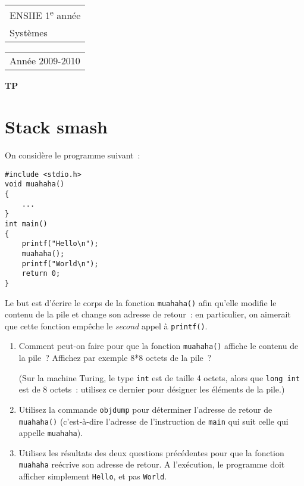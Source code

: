 \documentclass[a4paper,12pt]{article}
\begin{document}
{\large\sffamily
\begin{tabular}[t]{l}
  ENSIIE 1\textsuperscript{e} année\\
  Systèmes
\end{tabular}%
\hfill%
\begin{tabular}[t]{r}
  Année 2009-2010
\end{tabular}}

\vspace{2em}
\begin{center}
  \Large\bfseries\sffamily TP 
\end{center}
\vspace{1em}


\section{Stack smash}

On considère le programme suivant~:
\begin{verbatim}
#include <stdio.h>
void muahaha()
{
    ...
}
int main()
{
    printf("Hello\n");
    muahaha();
    printf("World\n");
    return 0;
}
\end{verbatim}
Le but est d'écrire le corps de la fonction \texttt{muahaha()} afin
qu'elle modifie le contenu de la pile et change son adresse de
retour~: en particulier, on aimerait que cette fonction empêche le
\emph{second} appel à \texttt{printf()}.

\begin{enumerate}
\item Comment peut-on faire pour que la fonction \texttt{muahaha()}
  affiche le contenu de la pile~? Affichez par exemple 8*8 octets de
  la pile~?

  (Sur la machine Turing, le type \texttt{int} est de taille 4 octets,
  alors que \texttt{long int} est de 8 octets~: utilisez ce dernier
  pour désigner les éléments de la pile.)
\item Utilisez la commande \texttt{objdump} pour déterminer l'adresse
  de retour de \texttt{muahaha()} (c'est-à-dire l'adresse de
  l'instruction de \texttt{main} qui suit celle qui appelle
  \texttt{muahaha}).
\item Utilisez les résultats des deux questions précédentes pour
  que la fonction \texttt{muahaha} reécrive son adresse de retour. A
  l'exécution, le programme doit afficher simplement \texttt{Hello},
  et pas \texttt{World}.
\end{enumerate}
\end{document}
